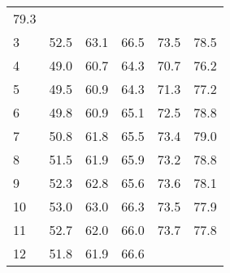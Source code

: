 \begin{tabular}{llllll}
  \multicolumn{1}{r}{79.3} \\
\multicolumn{1}{l}{\hspace{3em}3} &
  \multicolumn{1}{|r}{52.5} &
  \multicolumn{1}{r}{63.1} &
  \multicolumn{1}{r}{66.5} &
  \multicolumn{1}{r}{73.5} &
  \multicolumn{1}{r}{78.5} \\
\multicolumn{1}{l}{\hspace{3em}4} &
  \multicolumn{1}{|r}{49.0} &
  \multicolumn{1}{r}{60.7} &
  \multicolumn{1}{r}{64.3} &
  \multicolumn{1}{r}{70.7} &
  \multicolumn{1}{r}{76.2} \\
\multicolumn{1}{l}{\hspace{3em}5} &
  \multicolumn{1}{|r}{49.5} &
  \multicolumn{1}{r}{60.9} &
  \multicolumn{1}{r}{64.3} &
  \multicolumn{1}{r}{71.3} &
  \multicolumn{1}{r}{77.2} \\
\multicolumn{1}{l}{\hspace{3em}6} &
  \multicolumn{1}{|r}{49.8} &
  \multicolumn{1}{r}{60.9} &
  \multicolumn{1}{r}{65.1} &
  \multicolumn{1}{r}{72.5} &
  \multicolumn{1}{r}{78.8} \\
\multicolumn{1}{l}{\hspace{3em}7} &
  \multicolumn{1}{|r}{50.8} &
  \multicolumn{1}{r}{61.8} &
  \multicolumn{1}{r}{65.5} &
  \multicolumn{1}{r}{73.4} &
  \multicolumn{1}{r}{79.0} \\
\multicolumn{1}{l}{\hspace{3em}8} &
  \multicolumn{1}{|r}{51.5} &
  \multicolumn{1}{r}{61.9} &
  \multicolumn{1}{r}{65.9} &
  \multicolumn{1}{r}{73.2} &
  \multicolumn{1}{r}{78.8} \\
\multicolumn{1}{l}{\hspace{3em}9} &
  \multicolumn{1}{|r}{52.3} &
  \multicolumn{1}{r}{62.8} &
  \multicolumn{1}{r}{65.6} &
  \multicolumn{1}{r}{73.6} &
  \multicolumn{1}{r}{78.1} \\
\multicolumn{1}{l}{\hspace{3em}10} &
  \multicolumn{1}{|r}{53.0} &
  \multicolumn{1}{r}{63.0} &
  \multicolumn{1}{r}{66.3} &
  \multicolumn{1}{r}{73.5} &
  \multicolumn{1}{r}{77.9} \\
\multicolumn{1}{l}{\hspace{3em}11} &
  \multicolumn{1}{|r}{52.7} &
  \multicolumn{1}{r}{62.0} &
  \multicolumn{1}{r}{66.0} &
  \multicolumn{1}{r}{73.7} &
  \multicolumn{1}{r}{77.8} \\
\multicolumn{1}{l}{\hspace{3em}12} &
  \multicolumn{1}{|r}{51.8} &
  \multicolumn{1}{r}{61.9} &
  \multicolumn{1}{r}{66.6} &

\end{tabular}

